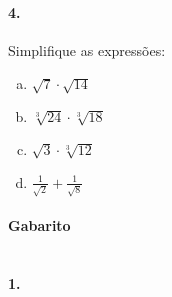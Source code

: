 \documentclass[a4paper,12pt]{article}
\begin{document}
\begin{multicols}{2}
\paragraph*{4.} Simplifique as expressões:
\begin{enumerate}[a)]
    \item $\sqrt{7}\cdot\sqrt{14}$
    \item $\sqrt[3]{24}\cdot\sqrt[3]{18}$
    \item $\sqrt{3}\cdot\sqrt[3]{12}$
    \item $\displaystyle\frac{1}{\sqrt{2}} + \frac{1}{\sqrt{8}}$
\end{enumerate}
\end{multicols}
 
\vspace*{\fill}
{\footnotesize
\paragraph*{Gabarito} \hspace*{\fill}\\
\textbf{1.} \\
}
\end{document}
